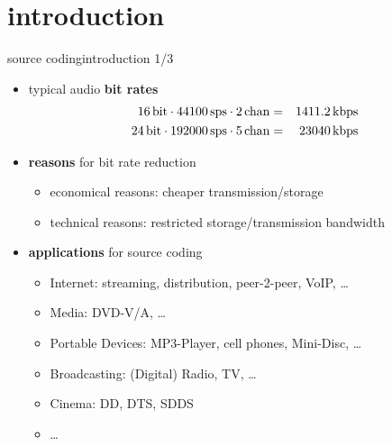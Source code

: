 


\subtitle{Part 23: Source Coding}


	

\section[intro]{introduction}

	\begin{frame}{source coding}{introduction 1/3}
		\begin{itemize}
			\item	typical audio \textbf{bit rates}
				\begin{eqnarray}
					\unit[16]{bit}\cdot\unit[44100]{sps}\cdot\unit[2]{chan} &=& \unit[1411.2]{kbps}\nonumber\\
					\unit[24]{bit}\cdot\unit[192000]{sps}\cdot\unit[5]{chan} &=& \unit[23040]{kbps}\nonumber
				\end{eqnarray}
			\vspace{-5mm}
			\item<2->	\textbf{reasons} for bit rate reduction
				\begin{itemize}
					\item	economical reasons: cheaper transmission/storage
					\item	technical reasons: restricted storage/transmission bandwidth
				\end{itemize}
			\smallskip
			\item<3->	\textbf{applications} for source coding
				\begin{itemize}
					\item	Internet: streaming, distribution, peer-2-peer, VoIP, \ldots
					\item	Media: DVD-V/A, \ldots
					\item	Portable Devices: MP3-Player, cell phones, Mini-Disc, \ldots
					\item	Broadcasting: (Digital) Radio, TV, \ldots
					\item	Cinema: DD, DTS, SDDS
					\item	\ldots
				\end{itemize}
		\end{itemize}
	\end{frame}
